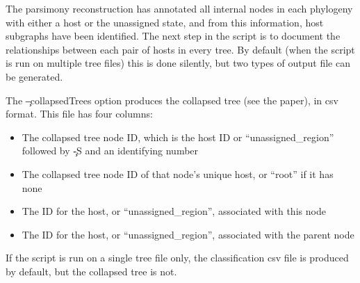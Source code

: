 The parsimony reconstruction has annotated all internal nodes in each phylogeny with either a host or the unassigned state, and from this information, host subgraphs have been identified.
The next step in the script is to document the relationships between each pair of hosts in every tree.
By default (when the script is run on multiple tree files) this is done silently, but two types of output file can be generated.

The \c{--collapsedTrees} option produces the collapsed tree (see the \p paper), in csv format.
This file has four columns:
\begin{itemize}
\item The collapsed tree node ID, which is the host ID or ``unassigned\_region'' followed by \c{-S} and an identifying number
\item The collapsed tree node ID of that node's unique host, or ``root'' if it has none
\item The ID for the host, or ``unassigned\_region'', associated with this node
\item The ID for the host, or ``unassigned\_region'', associated with the parent node
\end{itemize}

If the script is run on a single tree file only, the classification csv file is produced by default, but the collapsed tree is not.

